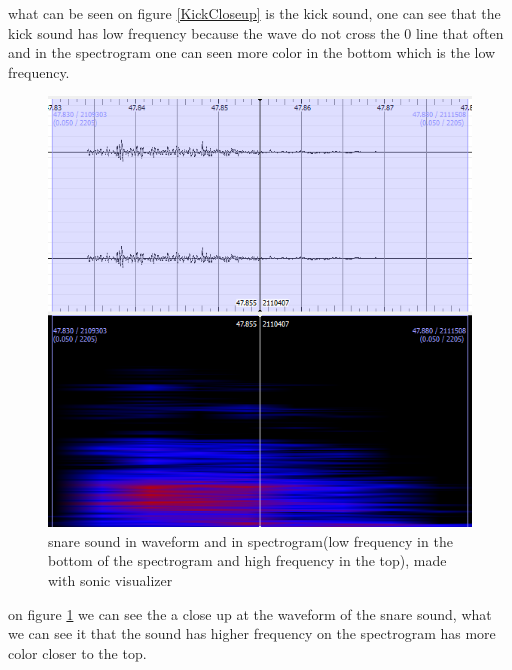 what can be seen on figure \ref{KickCloseup} is the kick sound, one can see that the kick sound has low frequency because the wave do not cross the 0 line that often and in the spectrogram one can seen more color in the bottom which is the low frequency.\\ 
\begin{figure}[h]
	\begin{center}
		\includegraphics[scale = 0.5]{fig/Snare-close-up-with-spectrogram.png}
		\caption{snare sound in waveform and in spectrogram(low frequency in the bottom of the spectrogram and high frequency in the top), made with sonic visualizer}
		\label{snareCloseup}
	\end{center}
\end{figure}
on figure \ref{snareCloseup} we can see the a close up at the waveform of the snare sound, what we can see it that the sound has higher frequency on the spectrogram has more color closer to the top. 
\\
